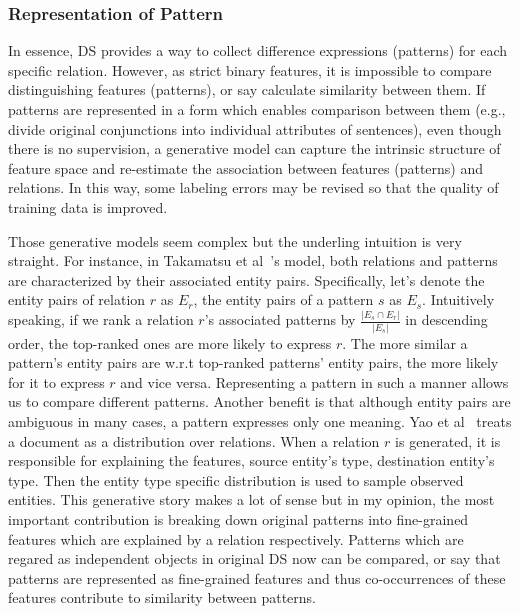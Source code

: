 \documentclass[10pt]{article} %
\theoremstyle{definition}
\theoremstyle{definition}
\begin{document}
\subsubsection{Representation of Pattern}
In essence, DS provides a way to collect difference expressions (patterns) for each specific relation. 
However, as strict binary features, it is impossible to compare distinguishing features (patterns), or say calculate similarity between them. 
If patterns are represented in a form which enables comparison between them (e.g., divide original conjunctions into individual attributes of sentences), 
even though there is no supervision, a generative model can capture the intrinsic structure of feature space and re-estimate the association between features (patterns) and relations. 
In this way, some labeling errors may be revised so that the quality of training data is improved. 



Those generative models seem complex but the underling intuition is very straight. 
For instance, in Takamatsu et al~\cite{takagenerative}'s model, both relations and patterns are characterized by their associated entity pairs. 
Specifically, let's denote the entity pairs of relation $r$ as $E_r$, the entity pairs of a pattern $s$ as $E_s$. 
Intuitively speaking, if we rank a relation $r$'s associated patterns by $\frac{\vert E_s \cap E_r \vert}{\vert E_s \vert}$ in descending order, the top-ranked ones are more likely to express $r$. 
The more similar a pattern's entity pairs are w.r.t top-ranked patterns' entity pairs, the more likely for it to express $r$ and vice versa. 
Representing a pattern in such a manner allows us to compare different patterns. 
Another benefit is that although entity pairs are ambiguous in many cases, a pattern expresses only one meaning. 
Yao et al~\cite{yaolda} treats a document as a distribution over relations. 
When a relation $r$ is generated, it is responsible for explaining the features, source entity's type, destination entity's type. 
Then the entity type specific distribution is used to sample observed entities. 
This generative story makes a lot of sense but in my opinion, the most important contribution is breaking down original patterns into fine-grained features which are explained by a relation respectively. 
Patterns which are regared as independent objects in original DS now can be compared, 
or say that patterns are represented as fine-grained features and thus co-occurrences of these features contribute to similarity between patterns. 
\end{document}

